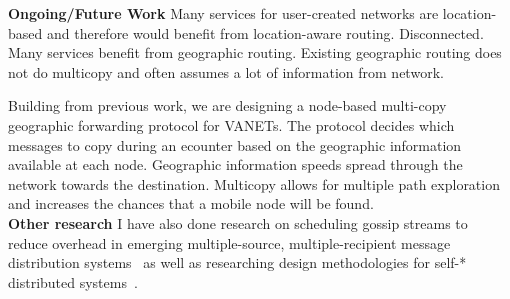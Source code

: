 \documentclass[10pt]{article}
\begin{document}
\noindent \textbf{Ongoing/Future Work}
Many services for user-created networks are location-based and therefore would
benefit from location-aware routing.
Disconnected.  Many services benefit from geographic routing.  Existing
geographic routing does not do multicopy and often assumes a lot of information
from network.

Building from previous work, we are designing a node-based multi-copy geographic
forwarding protocol for VANETs.  The protocol decides which messages to copy
during an ecounter based on the geographic information available at each node.
Geographic information speeds spread through the network towards the
destination.  Multicopy allows for multiple path exploration and increases the
chances that a mobile node will be found. \\


\noindent \textbf{Other research}
I have also done research on scheduling gossip streams to reduce
overhead in emerging multiple-source, multiple-recipient message distribution
systems~\cite{ucan:piggyback:midsens07} as well as researching design
methodologies for self-* distributed systems~\cite{gupta:methodology:lncs05}.

\footnotesize


\end{document}
